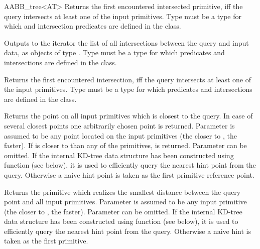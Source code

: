 \begin{ccRefClass}{AABB_tree<AT>}
{Returns the first encountered intersected primitive, iff the query intersects at least one of the input primitives. Type  must be a type for which  and intersection predicates are defined in the  class.}


	
{Outputs to the iterator the list of all intersections between the query and input data, as objects of type . Type  must be a type for which  predicates and intersections are defined in the  class.}

{Returns the first encountered intersection, iff the query intersects at least one of the input primitives. Type  must be a type for which  predicates and intersections are defined in the  class.}




{Returns the point on all input primitives which is closest to the query. In case of several closest points one arbitrarily chosen point is returned.  Parameter  is assumed to be any point located on the input primitives (the closer  to , the faster). If  is closer to  than any of the primitives,  is returned. Parameter  can be omitted. If the internal KD-tree data structure has been constructed using function  (see below), it is used to efficiently query the nearest hint point from the query. Otherwise a naive hint point is taken as the first primitive reference point. }

{Returns the primitive which realizes the smallest distance between the query point and all input primitives. Parameter  is assumed to be any input primitive (the closer  to , the faster). Parameter  can be omitted. If the internal KD-tree data structure has been constructed using function  (see below), it is used to efficiently query the nearest hint point from the query. Otherwise a naive hint is taken as the first primitive. }


\end{ccRefClass}
